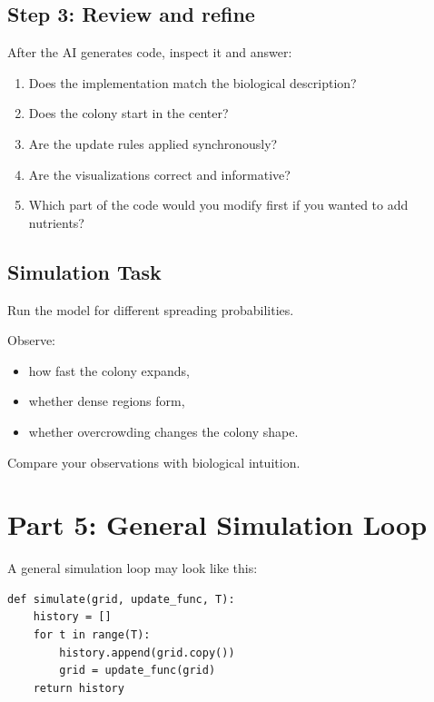 \documentclass[paper=letter, fontsize=12pt]{article}
\numberwithin{equation}{section}
\begin{document}
\subsection*{Step 3: Review and refine}

\begin{taskbox}
After the AI generates code, inspect it and answer:
\begin{enumerate}[label=\arabic*.]
\item Does the implementation match the biological description?
\item Does the colony start in the center?
\item Are the update rules applied synchronously?
\item Are the visualizations correct and informative?
\item Which part of the code would you modify first if you wanted to add nutrients?
\end{enumerate}
\end{taskbox}

\subsection*{Simulation Task}

Run the model for different spreading probabilities.

\begin{taskbox}
Observe:
\begin{itemize}
\item how fast the colony expands,
\item whether dense regions form,
\item whether overcrowding changes the colony shape.
\end{itemize}

Compare your observations with biological intuition.
\end{taskbox}

\section*{Part 5: General Simulation Loop}

A general simulation loop may look like this:

\begin{lstlisting}
def simulate(grid, update_func, T):
    history = []
    for t in range(T):
        history.append(grid.copy())
        grid = update_func(grid)
    return history
\end{lstlisting}
\end{document}
